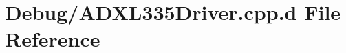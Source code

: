 \hypertarget{_debug_2_a_d_x_l335_driver_8cpp_8d}{\section{\-Debug/\-A\-D\-X\-L335\-Driver.cpp.\-d \-File \-Reference}
\label{_debug_2_a_d_x_l335_driver_8cpp_8d}
}
